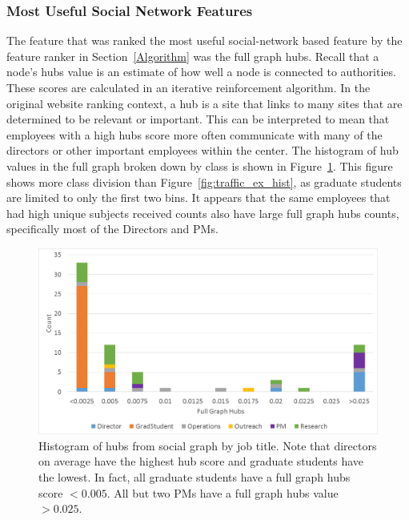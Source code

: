\documentclass[12pt]{report}
\begin{document}
\subsubsection{Most Useful Social Network Features}
The feature that was ranked the most useful social-network based feature by the feature ranker in Section~\ref{Algorithm} was the full graph hubs.
Recall that a node's hubs value is an estimate of how well a node is connected to authorities.
These scores are calculated in an iterative reinforcement algorithm.
In the original website ranking context, a hub is a site that links to many sites that are determined to be relevant or important.
This can be interpreted to mean that employees with a high hubs score more often communicate with many of the directors or other important employees within the center.
The histogram of hub values in the full graph broken down by class is shown in Figure~\ref{fig:social_ex_hist}.
This figure shows more class division than Figure~\ref{fig:traffic_ex_hist}, as graduate students are limited to only the first two bins.
It appears that the same employees that had high unique subjects received counts also have large full graph hubs counts, specifically most of the Directors and PMs.

\begin{figure}[t]
    \centering
        \includegraphics[width=\columnwidth,trim={.6mm 2mm 0.6mm 3mm},clip]{Hubs_hist}
        \vspace{-17pt}
        \caption[Full graph hubs histogram]{Histogram of hubs from social graph by job title.  Note that directors on average have the highest hub score and graduate students have the lowest.  In fact, all graduate students have a full graph hubs score $<0.005$.  All but two PMs have a full graph hubs value $>0.025$.}
        \label{fig:social_ex_hist}
\end{figure}
\end{document}
